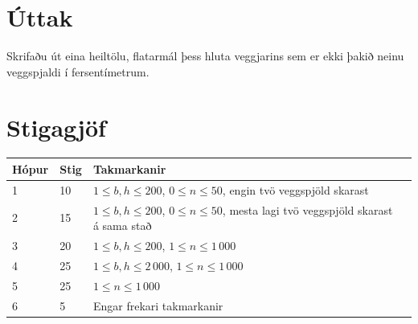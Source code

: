 \section*{Úttak}
Skrifaðu út eina heiltölu, flatarmál þess hluta veggjarins sem er ekki þakið neinu veggspjaldi í fersentímetrum.

\section*{Stigagjöf}
\begin{tabular}{|l|l|l|l|}
\hline
Hópur & Stig & Takmarkanir \\ \hline
1     & 10    & $1 \leq b, h \leq 200$, $0 \leq n \leq 50$, engin tvö veggspjöld skarast \\ \hline %
2     & 15   & $1 \leq b, h \leq 200$, $0 \leq n \leq 50$, mesta lagi tvö veggspjöld skarast á sama stað\\ \hline %
3     & 20   & $1 \leq b, h \leq 200$, $1 \leq n \leq 1\,000$  \\ \hline %
4     & 25   & $1 \leq b, h \leq 2\,000$, $1 \leq n \leq 1\,000$ \\ \hline %
5     & 25   & $1 \leq n \leq 1\,000$ \\ \hline %
6     & 5   & Engar frekari takmarkanir \\ \hline %
\end{tabular}
